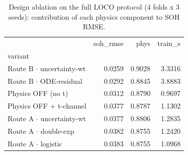 \begin{table}
\caption{Design ablation on the full LOCO protocol (4 folds x 3 seeds): contribution of each physics component to SOH RMSE.}
\label{tab:ablation_design}
\begin{tabular}{lrrr}
\toprule
 & soh\_rmse & phys & train\_s \\
variant &  &  &  \\
\midrule
Route B $\cdot$ uncertainty-wt & 0.0259 & 0.9028 & 3.3316 \\
Route B $\cdot$ ODE-residual & 0.0292 & 0.8845 & 3.8883 \\
Physics OFF (no t) & 0.0312 & 0.8790 & 0.9697 \\
Physics OFF + t-channel & 0.0377 & 0.8787 & 1.1302 \\
Route A $\cdot$ uncertainty-wt & 0.0377 & 0.8806 & 1.2835 \\
Route A $\cdot$ double-exp & 0.0382 & 0.8755 & 1.2420 \\
Route A $\cdot$ logistic & 0.0383 & 0.8755 & 1.0968 \\
\bottomrule
\end{tabular}
\end{table}
